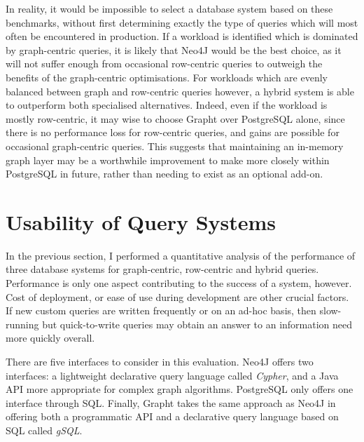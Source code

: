 In reality, it would be impossible to select a database system based on these
benchmarks, without first determining exactly the type of queries which will
most often be encountered in production. If a workload is identified which is
dominated by graph-centric queries, it is likely that Neo4J would be the best
choice, as it will not suffer enough from occasional row-centric queries to
outweigh the benefits of the graph-centric optimisations. For workloads which
are evenly balanced between graph and row-centric queries however, a hybrid
system is able to outperform both specialised alternatives. Indeed, even if
the workload is mostly row-centric, it may wise to choose Grapht over
PostgreSQL alone, since there is no performance loss for row-centric queries,
and gains are possible for occasional graph-centric queries. This suggests
that maintaining an in-memory graph layer may be a worthwhile improvement to
make more closely within PostgreSQL in future, rather than needing to exist as
an optional add-on.





\section{Usability of Query Systems} %
\label{sec:usability_of_query_systems}


In the previous section, I performed a quantitative analysis of the
performance of three database systems for graph-centric, row-centric and
hybrid queries. Performance is only one aspect contributing to the
success of  a system, however. Cost of deployment, or ease of use during development are other crucial
factors. If new custom queries are written frequently or on an ad-hoc basis, then
slow-running but quick-to-write queries may obtain an answer to an information need
more quickly overall.  

There are five interfaces to consider in this evaluation. Neo4J offers two
interfaces: a lightweight declarative query language called \textit{Cypher},
and a Java API more appropriate for complex graph
algorithms. PostgreSQL only offers one interface through SQL. Finally, Grapht
takes the same approach as Neo4J in offering both a programmatic API and a
declarative query language based on SQL called \textit{gSQL}.


